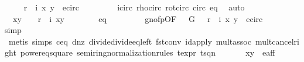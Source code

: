 \begin{isabellebody}
\ \isamarkupfalse%
\ {\isachardoublequoteopen}{\isacharparenleft}{\isasymtau}\ {\isasymcirc}\ r\ {\isasymcirc}\ i{\isacharparenright}\ {\isacharparenleft}x{\isacharcomma}\ y{\isacharparenright}\ {\isasymin}\ e{\isacharunderscore}circ{\isachardoublequoteclose}\ \isanewline
\ \ \ \ \ \ \isamarkupfalse%
\ i{\isacharunderscore}circ\ rho{\isacharunderscore}circ\ rot{\isacharunderscore}circ\ {\isasymtau}{\isacharunderscore}circ\ eq{\isacharparenleft}{}{\isacharparenright}\ \isamarkupfalse%
\ auto\isanewline
\ \ \ \ \isamarkupfalse%
\ {\isachardoublequoteopen}{\isasymtau}\ {\isacharparenleft}x{\isacharprime}{\isacharcomma}y{\isacharprime}{\isacharparenright}\ {\isasymnoteq}\ {\isacharparenleft}{\isasymtau}\ {\isasymcirc}\ r\ {\isasymcirc}\ i{\isacharparenright}\ {\isacharparenleft}x{\isacharcomma}y{\isacharparenright}{\isachardoublequoteclose}\isanewline
\ \ \ \ \ \ \isamarkupfalse%
\ eq{\isacharparenleft}{}{\isacharparenright}\ \isanewline
\ \ \ \ \ \ \isamarkupfalse%
\ g{\isacharunderscore}no{\isacharunderscore}fp{\isacharbrackleft}OF\ {\isacartoucheopen}{\isasymtau}\ {\isasymin}\ G{\isacartoucheclose}\ {\isacartoucheopen}{\isacharparenleft}{\isasymtau}\ {\isasymcirc}\ r\ {\isasymcirc}\ i{\isacharparenright}\ {\isacharparenleft}x{\isacharcomma}\ y{\isacharparenright}\ {\isasymin}\ e{\isacharunderscore}circ{\isacartoucheclose}{\isacharbrackright}\ \isanewline
\ \ \ \ \ \ \isamarkupfalse%
{\isacharparenleft}simp{\isacharparenright}\isanewline
\ \ \ \ \ \ \isamarkupfalse%
\ {\isacharparenleft}metis\ {\isasymtau}{\isachardot}simps\ c{\isacharunderscore}eq{\isacharunderscore}{}\ d{\isacharunderscore}nz\ divide{\isacharunderscore}divide{\isacharunderscore}eq{\isacharunderscore}left\ fst{\isacharunderscore}conv\ id{\isacharunderscore}apply\ mult{\isachardot}assoc\ mult{\isacharunderscore}cancel{\isacharunderscore}right{}\ power{}{\isacharunderscore}eq{\isacharunderscore}square\ semiring{\isacharunderscore}normalization{\isacharunderscore}rules{\isacharparenleft}{}{}{\isacharparenright}\ t{\isacharunderscore}expr{\isacharparenleft}{}{\isacharparenright}\ t{\isacharunderscore}sq{\isacharunderscore}n{}{\isacharparenright}\isanewline
\ \ \ \ \isamarkupfalse%
\ {\isachardoublequoteopen}{\isasymtau}\ {\isacharparenleft}x{\isacharprime}{\isacharcomma}y{\isacharprime}{\isacharparenright}\ {\isasymin}\ e{\isacharunderscore}aff{\isachardoublequoteclose}\ \isanewline

\end{isabellebody}
